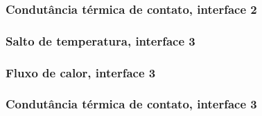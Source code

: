 \begin{frame}
	\frametitle{Condutância térmica de contato, interface 2}
	\begin{figure}[H]		
		\legendagraficos
	\end{figure}
\end{frame}

\begin{frame}
	\frametitle{Salto de temperatura, interface 3}
	\begin{figure}[H]		
		\legendagraficos	
		\graficosctclegenda		
	\end{figure}
\end{frame}

\begin{frame}
	\frametitle{Fluxo de calor, interface 3}
	\begin{figure}[H]		
		\legendagraficos
		\graficosctclegenda		
	\end{figure}
\end{frame}

\begin{frame}
	\frametitle{Condutância térmica de contato, interface 3}
	\begin{figure}[H]		
		\legendagraficos
	\end{figure}
\end{frame}